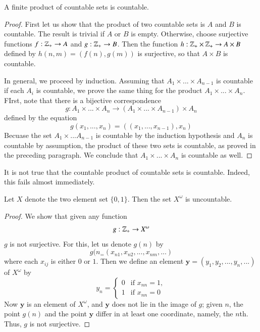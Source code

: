 \documentclass[12pt, a4paper, oneside, openright, titlepage]{book}
\begin{document}
\begin{appendices}
    \begin{thm}
        A finite product of countable sets is countable.
    \end{thm}
    \begin{proof}
        First let us show that the product of two countable sets is $A$ and $B$ is countable. The result is trivial if $A$ or $B$ is empty. Otherwise, choose surjective functions $f:\mathbb Z_+\rightarrow A$ and $g:\mathbb Z_+\rightarrow B$. Then the function $h:\mathbb Z_+\times \mathbb Z_+\rightarrow A\times B$ defined by $h(n,m) = (f(n),g(m))$ is surjective, so that $A\times B$ is countable.


        In general, we proceed by induction. Assuming that $A_1\times ... \times A_{n-1}$ is countable if each $A_i$ is countable, we prove the same thing for the product $A_1\times ... \times A_n$. FIrst, note that there is a bijective correspondence \begin{equation*}
            g:A_1\times ... \times A_n\rightarrow (A_1\times ... \times A_{n-1})\times A_n
        \end{equation*}
        defined by the equation \begin{equation*}
            g(x_1,...,x_n) = ((x_1,...,x_{n-1}),x_n)
        \end{equation*}
        Becuase the set $A_1\times ... A_{n-1}$ is countable by the induction hypothesis and $A_n$ is countable by assumption, the product of these two sets is countable, as proved in the preceding paragraph. We conclude that $A_1\times ... \times A_n$ is countable as well.
    \end{proof}

    It is not true that the countable product of countable sets is countable. Indeed, this fails almost immediately.

    \begin{thm}
        Let $X$ denote the two element set $\{0,1\}$. Then the set $X^{\omega}$ is uncountable.
    \end{thm}
    \begin{proof}
        We show that given any function $$g:\mathbb Z_+\rightarrow X^{\omega}$$ $g$ is not surjective. For this, let us denote $g(n)$ by \begin{equation*}
            g(n_ = (x_{n1},x_{n2},...,x_{nm},...)
        \end{equation*}
        where each $x_{ij}$ is either $0$ or $1$. Then we define an element $\mathbf{y} = (y_1,y_2,...,y_n,...)$ of $X^{\omega}$ by \begin{equation*}
            y_n = \left\{\begin{array}{ll} 0 & \text{if } x_{nn} = 1,\\ 1 & \text{if } x_{nn} = 0\end{array}\right.
        \end{equation*}
        Now $\mathbf{y}$ is an element of $X^{\omega}$, and $\mathbf{y}$ does not lie in the image of $g$; given $n$, the point $g(n)$ and the point $\mathbf{y}$ differ in at least one coordinate, namely, the $n$th. Thus, $g$ is not surjective.
    \end{proof}



\end{appendices}
\end{document}
